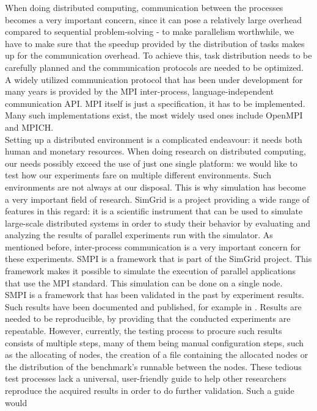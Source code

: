 When doing distributed computing, communication between the processes
becomes a very important concern, since it can pose a relatively large
overhead compared to sequential problem-solving - to make parallelism
worthwhile, we have to make sure that the speedup provided by the
distribution of tasks makes up for the communication overhead. To
achieve this, task distribution needs to be carefully planned and the
communication protocols are needed to be optimized. A widely utilized
communication protocol that has been under development for many years
is provided by the MPI\cite{mpif12} inter-process, language-independent
communication API. MPI itself is just a specification, it has to be
implemented. Many such implementations exist, the most widely used
ones include OpenMPI\cite{ompi04} and MPICH\cite{mpich12}.\\
Setting up a distributed environment is a complicated endeavour: it
needs both human and monetary resources. When doing research on
distributed computing, our needs possibly exceed the use of just one
single platform: we would like to test how our experiments fare on
multiple different environments. Such environments are not always at
our disposal. This is why simulation has become a very important field
of research. SimGrid\cite{clq08} is a project providing a wide range
of features in this regard: it is a scientific instrument that can be
used to simulate large-scale distributed systems in order to study
their behavior by evaluating and analyzing the results of parallel
experiments run with the simulator. As mentioned before, inter-process
communication is a very important concern for these experiments. SMPI
is a framework that is part of the SimGrid project. This framework
makes it possible to simulate the execution of parallel applications
that use the MPI standard. This simulation can be done on a single
node.\\
SMPI is a framework that has been validated in the past by experiment
results. Such results have been documented and published, for example
in \cite{csgscq11}. Results are needed to be reproducible, by
providing that the conducted experiments are repeatable. However,
currently, the testing process to procure such results
consists of multiple steps, many of them being manual configuration
steps, such as the allocating of nodes, the creation of a file
containing the allocated nodes or the distribution of the benchmark's
runnable between the nodes. These tedious test processes lack a
universal, user-friendly guide to help other researchers reproduce the
acquired results in order to do further validation. Such a guide would

